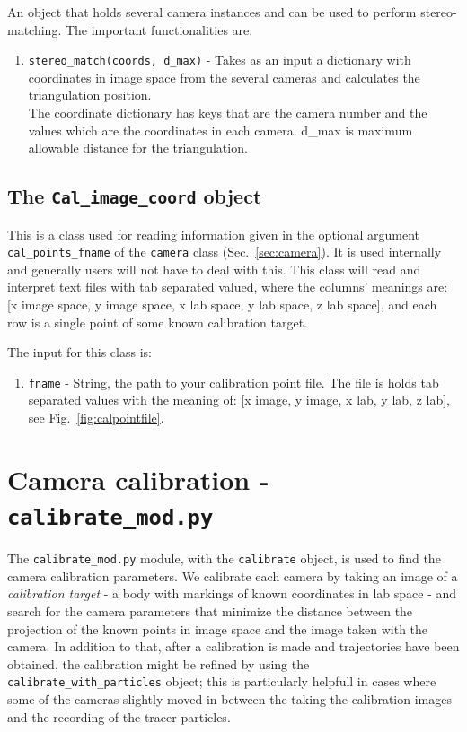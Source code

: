 \documentclass[10pt,a4paper]{article}
\begin{document}
An object that holds several camera instances and can be used to perform stereo-matching. The important functionalities are:


\begin{enumerate}
	\item \texttt{stereo\_match(coords, d\_max)} - Takes as an input a dictionary with coordinates in image space from the several cameras and calculates the triangulation position. \\ The coordinate dictionary has keys that are the camera number and the values which are the coordinates in each camera. d\_max is maximum allowable distance for the triangulation.
	
\end{enumerate}








\subsection{The \texttt{Cal\_image\_coord} object}\label{sec:calpointreader}

This is a class used for reading information given in the optional argument \texttt{cal\_points\_fname} of the \texttt{camera} class (Sec.~\ref{sec:camera}). It is used internally and generally users will not have to deal with this. This class will read and interpret text files with tab separated valued, where the columns' meanings are: [x image space, y image space, x lab space, y lab space, z lab space], and each row is a single point of some known calibration target.

The input for this class is:
\begin{enumerate}
	\item \texttt{fname} - String, the path to your calibration point file. The file is holds tab separated values with the meaning of: [x image, y image, x lab, y lab, z lab], see Fig.~\ref{fig:calpointfile}.
\end{enumerate}








\section{Camera calibration - \texttt{calibrate\_mod.py}}


The \texttt{calibrate\_mod.py} module, with the \texttt{calibrate} object, is used to find the camera calibration parameters. We calibrate each camera by taking an image of a \textit{calibration target} - a body with markings of known coordinates in lab space - and search for the camera parameters that minimize the distance between the projection of the known points in image space and the image taken with the camera. In addition to that, after a calibration is made and trajectories have been obtained, the calibration might be refined by using the \texttt{calibrate\_with\_particles} object; this is particularly helpfull in cases where some of the cameras slightly moved in between the taking the calibration images and the recording of the tracer particles.
\end{document}
